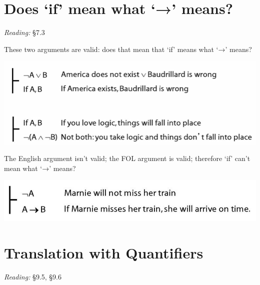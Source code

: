 \documentclass[12pt]{extarticle}
\begin{document}
\begin{multicols*}{3}
\begin{enumerate}
\end{enumerate}
 
 
 
\section{Does ‘if’ mean what ‘→’ means?}
 
\emph{Reading:} §7.3
 
\begin{minipage}{\columnwidth}
 
These two arguments are valid: does that mean that `if' means what `→' means?
 
\begin{center}
\includegraphics[scale=0.3]{img/if_is_arrow.png}
\end{center}
\end{minipage}
 
\begin{minipage}{\columnwidth}
 
The English argument isn't valid; the FOL argument is valid; therefore `if' can't mean what `→' means?
 
\begin{center}
\includegraphics[scale=0.3]{img/if_aint_arrow.png}
\end{center}
\end{minipage}
 
 
 
\section{Translation with Quantifiers}
 
\emph{Reading:} §9.5, §9.6
 
\begin{minipage}{\columnwidth}
 

\end{minipage}
\end{multicols*}
\end{document}
